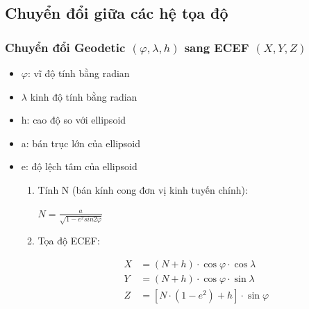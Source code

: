 \subsection{Chuyển đổi giữa các hệ tọa độ}
\subsubsection{Chuyển đổi Geodetic $(\varphi, \lambda, h)$ sang ECEF $(X, Y, Z)$}
\begin{itemize}
    \item $\varphi$: vĩ độ tính bằng radian
    \item $\lambda$ kinh độ tính bằng radian
    \item h: cao độ so với ellipsoid
    \item a: bán trục lớn của ellipsoid
    \item e: độ lệch tâm của ellipsoid
    \begin{enumerate}
        \item Tính N (bán kính cong đơn vị kinh tuyến chính):
        \begin{center}
            $N = \frac{a}{\sqrt{1 - e^2sin2\varphi}}$
        \end{center}
        \item Tọa độ ECEF:
        \begin{center}
$$
\begin{aligned}
X &= (N + h) \cdot \cos\varphi \cdot \cos\lambda \\
Y &= (N + h) \cdot \cos\varphi \cdot \sin\lambda \\
Z &= \left[N \cdot (1 - e^2) + h\right] \cdot \sin\varphi
\end{aligned}
$$


        \end{center}
    \end{enumerate}
\end{itemize}

